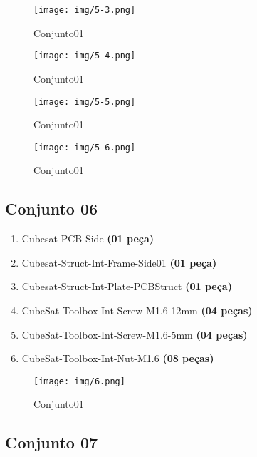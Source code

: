 \begin{figure}[ht!]
	\centering
	\texttt{[image: img/5-3.png]}
	\caption{Conjunto01}
	\label{5-3}
\end{figure}

\begin{figure}[ht!]
	\centering
	\texttt{[image: img/5-4.png]}
	\caption{Conjunto01}
	\label{5-4}
\end{figure}

\begin{figure}[ht!]
	\centering
	\texttt{[image: img/5-5.png]}
	\caption{Conjunto01}
	\label{5-5}
\end{figure}

\begin{figure}[ht!]
	\centering
	\texttt{[image: img/5-6.png]}
	\caption{Conjunto01}
	\label{5-6}
\end{figure}



\newpage
\subsection{Conjunto 06}\label{subs:c06}

\begin{enumerate}[label*=\ref*{subs:c06}\arabic*]
	\item Cubesat-PCB-Side \textbf{(01 peça)}
	\item Cubesat-Struct-Int-Frame-Side01 \textbf{(01 peça)}
	\item Cubesat-Struct-Int-Plate-PCBStruct \textbf{(01 peça)}
	\item CubeSat-Toolbox-Int-Screw-M1.6-12mm \textbf{(04 peças)}
	\item CubeSat-Toolbox-Int-Screw-M1.6-5mm \textbf{(04 peças)}
	\item CubeSat-Toolbox-Int-Nut-M1.6 \textbf{(08 peças)}
\end{enumerate}

\begin{figure}[ht!]
	\centering
	\texttt{[image: img/6.png]}
	\caption{Conjunto01}
	\label{6}
\end{figure}



\newpage
\subsection{Conjunto 07}\label{subs:c07}

